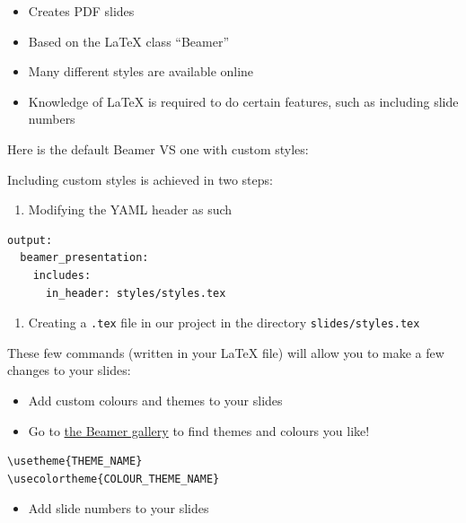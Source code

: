 \documentclass[]{article}
\providecommand{\tightlist}{%
  \setlength{\itemsep}{0pt}\setlength{\parskip}{0pt}}
\begin{document}
\begin{itemize}
\tightlist
\item
  Creates PDF slides
\item
  Based on the LaTeX class ``Beamer''
\item
  Many different styles are available online
\item
  Knowledge of LaTeX is required to do certain features, such as
  including slide numbers
\end{itemize}

Here is the default Beamer VS one with custom styles:

Including custom styles is achieved in two steps:

\begin{enumerate}
\def\labelenumi{\arabic{enumi}.}
\tightlist
\item
  Modifying the YAML header as such
\end{enumerate}

\begin{verbatim}
output:
  beamer_presentation:
    includes:
      in_header: styles/styles.tex
\end{verbatim}

\begin{enumerate}
\def\labelenumi{\arabic{enumi}.}
\setcounter{enumi}{1}
\tightlist
\item
  Creating a \texttt{.tex} file in our project in the directory
  \texttt{slides/styles.tex}
\end{enumerate}

These few commands (written in your LaTeX file) will allow you to make a
few changes to your slides:

\begin{itemize}
\tightlist
\item
  Add custom colours and themes to your slides
\item
  Go to \href{http://deic.uab.es/~iblanes/beamer_gallery/}{the Beamer
  gallery} to find themes and colours you like!
\end{itemize}

\begin{verbatim}
\usetheme{THEME_NAME}
\usecolortheme{COLOUR_THEME_NAME}
\end{verbatim}

\begin{itemize}
\tightlist
\item
  Add slide numbers to your slides
\end{itemize}
\end{document}
